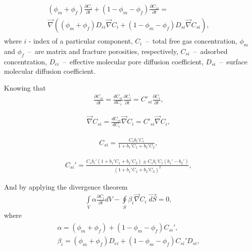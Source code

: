 \documentclass[a4paper,14pt,english]{extreport}
\begin{document}
 \begin{eqnarray}
 \begin{gathered}
 \label{eq:diffusuin_multicomp_diff}
  \left(\phi_{m}+\phi_{f}\right)\frac{\partial C_{i}}{\partial t} + \left(1-\phi_{m}-\phi_{f}\right)\frac{\partial C_{si}}{\partial t} = \\ \vec{\nabla} \left(\left(\phi_{m} + \phi_{f} \right)D_{ei} \vec{\nabla}C_{i} + \left(1-\phi_{m}-\phi_{f}\right) D_{si} \vec{\nabla}C_{s i}\right),
   \end{gathered}
 \end{eqnarray}
 where $i$ - index of  a particular component, $C_{i}$~--~total free gas concentration, $\phi_{m}$ and $\phi_{f}$~--~are matrix and fracture porosities, respectively, $C_{si}$~--~adsorbed concentration, $D_{ei}$~--~effective molecular pore diffusion coefficient, $D_{si}$~--~surface molecular diffusion coefficient.
 
 Knowing that
 \begin{eqnarray}
 \label{eq:variable_replace}
 \frac{\partial C_{si}}{\partial t} =  \frac{dC_{si}}{dC_{i}}\frac{\partial C_{i}}{\partial t} = C'_{si}\frac{\partial C_{i}}{\partial t},
 \end{eqnarray}
 
  \begin{eqnarray}
 \label{eq:variable_replace}
\vec\nabla C_{si} =  \frac{dC_{si}}{dC_{i}}\vec\nabla C_{i} = C'_{si}\vec\nabla C_{i},
 \end{eqnarray}
 
  \begin{eqnarray}
 \label{eq:conc_sorption}
 C_{si} =  \frac{C_{s} b_{i}' C_{i}}{1+b_{1}'C_{1}+b_{2}'C_{2}},
 \end{eqnarray}
 
  \begin{eqnarray}
 \label{eq:conc_sorption_deriv}
 C_{si}' =  \frac{C_{s}b_{i}' \left(1+b_{1}'C_{1}+b_{2}'C_{2}\right) \pm C_{s}b_{i}'C_{i} \left(b_{1}'-b_{2}'\right)}{\left(1+b_{1}'C_{1}+b_{2}'C_{2}\right)^2},
 \end{eqnarray}
 
 And by applying the divergence theorem 
  \begin{eqnarray}
 \label{eq:diffusuin_multicomp_integral}
 \int \limits_{V} \alpha \frac{\partial C_{i}}{\partial t} d V - \oint \limits_{S} \beta_{i} \vec{\nabla}C_{i} \; \vec{dS} = 0,
 \end{eqnarray}
where  
 \begin{eqnarray}
 \begin{gathered}
 \label{eq:alpha}
 \alpha  =  \left(\phi_{m}+\phi_{f}\right) + \left(1-\phi_{m}-\phi_{f}\right)C_{si}', \\ 
 \beta_{i}  = \left(\phi_{m}+ \phi_{f} \right) D_{ei} + \left(1-\phi_{m}-\phi_{f}\right) C_{si}'D_{si},
 \end{gathered}
 \end{eqnarray}
 
\end{document}

